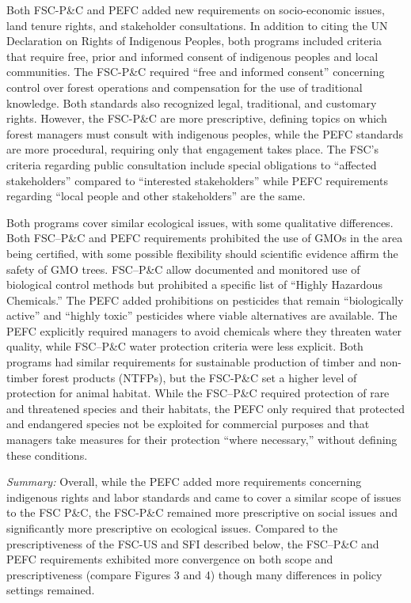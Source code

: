 \documentclass[
      12pt,
            Review ]{article}
\begin{document}
Both FSC-P\&C and PEFC added new requirements on socio-economic issues,
land tenure rights, and stakeholder consultations. In addition to citing
the UN Declaration on Rights of Indigenous Peoples, both programs
included criteria that require free, prior and informed consent of
indigenous peoples and local communities. The FSC-P\&C required ``free
and informed consent'' concerning control over forest operations and
compensation for the use of traditional knowledge. Both standards also
recognized legal, traditional, and customary rights. However, the
FSC-P\&C are more prescriptive, defining topics on which forest managers
must consult with indigenous peoples, while the PEFC standards are more
procedural, requiring only that engagement takes place. The FSC's
criteria regarding public consultation include special obligations to
``affected stakeholders'' compared to ``interested stakeholders'' while
PEFC requirements regarding ``local people and other stakeholders'' are
the same.

Both programs cover similar ecological issues, with some qualitative
differences. Both FSC--P\&C and PEFC requirements prohibited the use of
GMOs in the area being certified, with some possible flexibility should
scientific evidence affirm the safety of GMO trees. FSC--P\&C allow
documented and monitored use of biological control methods but
prohibited a specific list of ``Highly Hazardous Chemicals.'' The PEFC
added prohibitions on pesticides that remain ``biologically active'' and
``highly toxic'' pesticides where viable alternatives are available. The
PEFC explicitly required managers to avoid chemicals where they threaten
water quality, while FSC--P\&C water protection criteria were less
explicit. Both programs had similar requirements for sustainable
production of timber and non-timber forest products (NTFPs), but the
FSC-P\&C set a higher level of protection for animal habitat. While the
FSC--P\&C required protection of rare and threatened species and their
habitats, the PEFC only required that protected and endangered species
not be exploited for commercial purposes and that managers take measures
for their protection ``where necessary,'' without defining these
conditions.

\emph{Summary:} Overall, while the PEFC added more requirements
concerning indigenous rights and labor standards and came to cover a
similar scope of issues to the FSC P\&C, the FSC-P\&C remained more
prescriptive on social issues and significantly more prescriptive on
ecological issues. Compared to the prescriptiveness of the FSC-US and
SFI described below, the FSC--P\&C and PEFC requirements exhibited more
convergence on both scope and prescriptiveness (compare Figures 3 and 4)
though many differences in policy settings remained.
\end{document}
